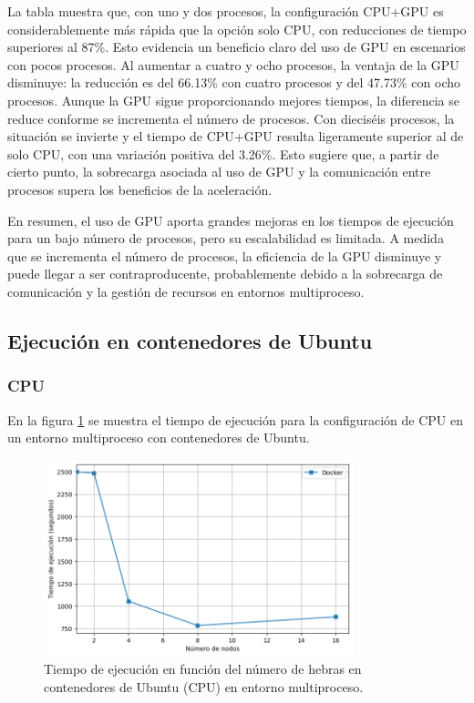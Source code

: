 La tabla muestra que, con uno y dos procesos, la configuración CPU+GPU es considerablemente más rápida que la opción solo CPU, con reducciones de tiempo superiores al 87\%. Esto evidencia un beneficio claro del uso de GPU en escenarios con pocos procesos. Al aumentar a cuatro y ocho procesos, la ventaja de la GPU disminuye: la reducción es del 66.13\% con cuatro procesos y del 47.73\% con ocho procesos. Aunque la GPU sigue proporcionando mejores tiempos, la diferencia se reduce conforme se incrementa el número de procesos. Con dieciséis procesos, la situación se invierte y el tiempo de CPU+GPU resulta ligeramente superior al de solo CPU, con una variación positiva del 3.26\%. Esto sugiere que, a partir de cierto punto, la sobrecarga asociada al uso de GPU y la comunicación entre procesos supera los beneficios de la aceleración.

En resumen, el uso de GPU aporta grandes mejoras en los tiempos de ejecución para un bajo número de procesos, pero su escalabilidad es limitada. A medida que se incrementa el número de procesos, la eficiencia de la GPU disminuye y puede llegar a ser contraproducente, probablemente debido a la sobrecarga de comunicación y la gestión de recursos en entornos multiproceso.

\subsection{Ejecución en contenedores de Ubuntu}
\subsubsection{CPU}

En la figura \ref{fig:multi-node_ubuntu_docker_time} se muestra el tiempo de ejecución para la configuración de CPU en un entorno multiproceso con contenedores de Ubuntu.

\begin{figure}[H]
    \centering
    \includegraphics[width=0.8\textwidth]{imagenes/cap5/multi-node_ubuntu_docker_time.png}
    \caption{Tiempo de ejecución en función del número de hebras en contenedores de Ubuntu (CPU) en entorno multiproceso.}
    \label{fig:multi-node_ubuntu_docker_time}
\end{figure}

